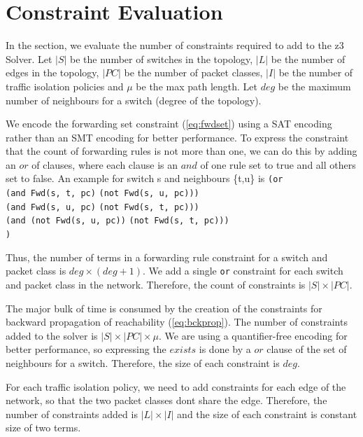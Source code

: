 \documentclass[]{sig}
\begin{document}
\section{Constraint Evaluation}
In the section, we evaluate the number of constraints required to add to the z3 Solver. Let $|S|$ be the number of switches in the topology, $|L|$ be the number of edges in the topology, $|PC|$ be the number of packet classes, $|I|$ be the number of traffic isolation policies and $\mu$ be the max path length. Let $deg$ be the maximum number of neighbours for a switch (degree of the topology).

We encode the forwarding set constraint (\cref{eq:fwdset}) using a SAT encoding rather than an SMT encoding for better performance. To express the constraint that the count of forwarding rules is not more than one, we can do this by adding an $or$ of clauses, where each clause is an $and$ of one rule set to true and all others set to false. An example for switch s and neighbours \{t,u\} is \newline
\verb|(or| \\
\hspace*{10pt}\verb|(and Fwd(s, t, pc)|  \verb|(not Fwd(s, u, pc)))| \\
\hspace*{10pt}\verb|(and Fwd(s, u, pc)|  \verb|(not Fwd(s, t, pc)))| \\
\hspace*{10pt}\verb|(and (not Fwd(s, u, pc))|  \verb|(not Fwd(s, t, pc)))|\\
\verb|)| 

Thus, the number of terms in a forwarding rule constraint for a switch and packet class is $deg \times (deg+1)$. We add a single \verb|or| constraint for each switch and packet class in the network. Therefore, the count of constraints is $|S| \times |PC|$.

The major bulk of time is consumed by the creation of the constraints for backward propagation of reachability (\cref{eq:bckprop}). The number of constraints added to the solver is $|S| \times |PC| \times \mu$. We are using a quantifier-free encoding for better performance, so expressing the $exists$ is done by a $or$ clause of the set of neighbours for a switch. Therefore, the size of each constraint is $deg$. 

For each traffic isolation policy, we need to add constraints for each edge of the network, so that the two packet classes dont share the edge. Therefore, the number of constraints added is $|L| \times |I|$ and the size of each constraint is constant size of two terms.
\end{document}
